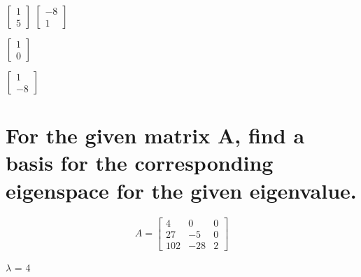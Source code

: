 \documentclass{exam}
\begin{document}
\begin{oneparchoices}

  \choice $\begin{bmatrix}
            1 \\
            5
          \end{bmatrix}$
  \choice $\begin{bmatrix}
            -8 \\
            1
          \end{bmatrix}$

  \choice $\begin{bmatrix}
            1 \\
            0
          \end{bmatrix}$

  \choice $\begin{bmatrix}
            1 \\
            -8
          \end{bmatrix}$
\end{oneparchoices}

\section{For the given matrix A, find a basis for the corresponding eigenspace for the given eigenvalue.}
\[
  A=
\left[ {\begin{array}{ccc}
   4 & 0 & 0 \\
   27 & -5 & 0 \\
   102 & -28 & 2
  \end{array} } \right]
\]

\begin{center}
\(\lambda\) = 4
\end{center}
\end{document}
